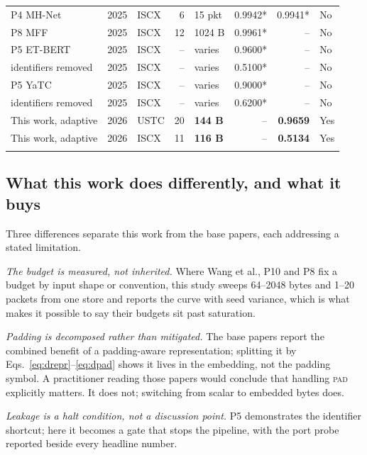 \documentclass[pdflatex,sn-mathphys-num]{sn-jnl}
\theoremstyle{thmstyleone}%
\theoremstyle{thmstylethree}%
\begin{document}
\begin{table}[tbp]
\begin{tabular}{@{}p{26mm}l l r p{16mm} r r p{15mm}@{}}
P4 MH-Net~\cite{p4}            & 2025 & ISCX &  6 & 15 pkt   & 0.9942* & 0.9941* & No \\
P8 MFF~\cite{p8}               & 2025 & ISCX & 12 & 1024 B   & 0.9961* & --     & No \\
P5 ET-BERT~\cite{p5, etbert}   & 2025 & ISCX & -- & varies   & 0.9600* & --     & No \\
\quad identifiers removed      & 2025 & ISCX & -- & varies   & 0.5100* & --     & No \\
P5 YaTC~\cite{p5, yatc}        & 2025 & ISCX & -- & varies   & 0.9000* & --     & No \\
\quad identifiers removed      & 2025 & ISCX & -- & varies   & 0.6200* & --     & No \\
\midrule
This work, adaptive            & 2026 & USTC & 20 & \textbf{144 B} & --     & \textbf{0.9659} & Yes \\
This work, adaptive            & 2026 & ISCX & 11 & \textbf{116 B} & --     & \textbf{0.5134} & Yes \\
\botrule
\end{tabular}
\end{table}

\subsection{What this work does differently, and what it buys}

Three differences separate this work from the base papers, each addressing a
stated limitation.

\emph{The budget is measured, not inherited.} Where Wang et al., P10 and P8
fix a budget by input shape or convention, this study sweeps 64--2048 bytes
and 1--20 packets from one store and reports the curve with seed variance, which is what
makes it possible to say their budgets sit past saturation.

\emph{Padding is decomposed rather than mitigated.} The base papers report
the combined benefit of a padding-aware representation; splitting it by
Eqs.~\eqref{eq:drepr}--\eqref{eq:dpad} shows it lives in the embedding, not the
padding symbol. A practitioner reading those papers would conclude that
handling \textsc{pad} explicitly matters. It does not; switching from scalar to
embedded bytes does.

\emph{Leakage is a halt condition, not a discussion point.} P5 demonstrates
the identifier shortcut; here it becomes a gate that stops the pipeline, with
the port probe reported beside every headline number.
\end{document}
